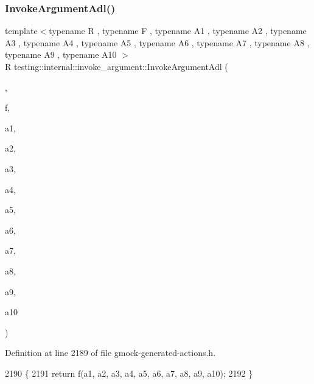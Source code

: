 \subsubsection{\texorpdfstring{Invoke\+Argument\+Adl()}{InvokeArgumentAdl()}\hspace{0.1cm}{\footnotesize\ttfamily [11/11]}}
{\footnotesize\ttfamily template$<$typename R , typename F , typename A1 , typename A2 , typename A3 , typename A4 , typename A5 , typename A6 , typename A7 , typename A8 , typename A9 , typename A10 $>$ \\
R testing\+::internal\+::invoke\+\_\+argument\+::\+Invoke\+Argument\+Adl (\begin{DoxyParamCaption}\item[{\hyperlink{structtesting_1_1internal_1_1invoke__argument_1_1AdlTag}{Adl\+Tag}}]{,  }\item[{F}]{f,  }\item[{A1}]{a1,  }\item[{A2}]{a2,  }\item[{A3}]{a3,  }\item[{A4}]{a4,  }\item[{A5}]{a5,  }\item[{A6}]{a6,  }\item[{A7}]{a7,  }\item[{A8}]{a8,  }\item[{A9}]{a9,  }\item[{A10}]{a10 }\end{DoxyParamCaption})}



Definition at line 2189 of file gmock-\/generated-\/actions.\+h.


\begin{DoxyCode}
2190                                   \{
2191   \textcolor{keywordflow}{return} f(a1, a2, a3, a4, a5, a6, a7, a8, a9, a10);
2192 \}
\end{DoxyCode}
